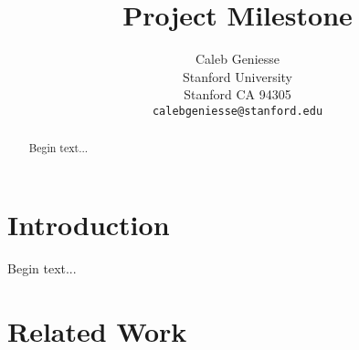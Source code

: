 \documentclass[10pt,twocolumn,letterpaper]{article}
\begin{document}
\title{Project Milestone}

\author{
  Caleb Geniesse\\
  Stanford University\\
  Stanford CA 94305\\
  {\tt\small calebgeniesse@stanford.edu}
}

\maketitle



\begin{abstract} %
  
  Begin text...

\end{abstract}



\section{Introduction} %

Begin text...



\section{Related Work} %
\end{document}
